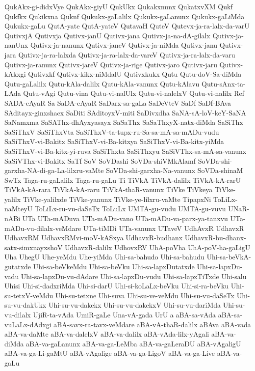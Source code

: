 {QukAkx-gi-didxVye
QukAkx-giyU
QukUkx
Qukakxnunx
QukatxvXM
Qukf
Qukfkx
Qukikxna
Quknf
Qukukx-gaLalilx
Qukukx-gaLanunx
Qukukx-gaLiMda
Qukukx-gaLu
QutA-yate
QutA-yateV
QutavaH
QuteV
Qutevx-ja-ra-lalx-da-varU
QutivxjA
Qutivxja
Qutivx-janU
Qutivx-jana
Qutivx-ja-na-dA-gilalx
Qutivx-ja-nanUnx
Qutivx-ja-nanunx
Qutivx-janeV
Qutivx-ja-niMda
Qutivx-janu
Qutivx-jara
Qutivx-ja-ra-lalxda
Qutivx-ja-ra-lalx-da-vareV
Qutivx-ja-ra-lalx-da-varu
Qutivx-ja-ranunx
Qutivx-jareV
Qutivx-ja-rige
Qutivx-jaro
Qutivx-jaru
Qutivx-kAkxgi
Qutivxkf
Qutivx-kikx-niMdalU
Qutivxkukx
Qutu
Qutu-doV-Sa-diMda
Qutu-gaLalilx
Qutu-kAla-dalilx
Qutu-kAla-vanunx
Qutu-kAlavu
Qutu-sAnx-ta-LAda
Qutu-vAgi
Qutu-vina
Qutu-vi-nalUlx
Qutu-vi-nalelxV
Qutu-vi-nalilx
Ref
SADA-cAyaR
Sa
SaDA-cAyaR
SaDarx-sa-gaLa
SaDeVteV
SaDf
SaDf-BAva
SAditayx-ginxshacx
SaDiti
SAditoyxV-miti
SaDivxdha
SaNA-sA-loV-keY-SaNA
SaNamxma
SaSAThx-dhAyxyasayx
SaSaThx
SaSaThxyX-natx-diMda
SaSiThx
SaSiThxV
SaSiThxVta
SaSiThxV-ta-tupx-ru-Sa-sa-mA-sa-mADu-vudu
SaSiThxV-vi-Bakitx
SaSiThxV-vi-Ba-kitxya
SaSiThxV-vi-Ba-kitx-yiMda
SaSiThxV-vi-Ba-kitx-yi-ruva
SaSiThxta
SaSiThxyu
SaSiVThx-sa-mA-sa-vanunx
SaSiVThx-vi-Bakitx
SaTf
SoV
SoVDashi
SoVDa-shiVMkAlamf
SoVDa-shi-garxha-NA-di-ga-La-lilxru-vaMte
SoVDa-shi-garxha-Na-vanunx
SoVDa-shinaM
SwTx
Taga-ru-gaLalilx
Taga-ru-gaLu
Ti
TiVkA
TiVkA-dalilx
TiVkA-kA-rarU
TiVkA-kA-rara
TiVkA-kA-raru
TiVkA-thaR-vanunx
TiVke
TiVkeya
TiVke-yalilx
TiVke-yalilxde
TiVke-yanunx
TiVke-ye-lilxru-vaMte
TipapxNi
ToLiLx-naMteyU
ToLiLx-ru-vu-daSeTx
ToLuLx
UMTA-gu-vudu
UMTA-gu-vuvu
UNaR-nABi
UTa
UTa-mADuva
UTa-mADu-vano
UTa-mADu-va-parx-ya-tanxvu
UTa-mADu-vu-dilalx-veMdare
UTa-tiMDi
UTa-vanunx
UTaveV
UdhAvxR
UdhavxR
UdhavxRM
UdhavxRMvi-moV-kASxya
UdhavxR-budhanx
UdhavxR-bu-dhanx-satx-simxnayxshoV
UdhavxR-dalilx
UdhovxRV
UhA-poVha
UhA-poV-ha-gaLigU
Uha
UhegU
Uhe-yeMdu
Uhe-yiMda
Uhi-sa-bahudo
Uhi-sa-bahudu
Uhi-sa-beVkA-gutatxde
Uhi-sa-beVkeMdu
Uhi-sa-beVku
Uhi-sa-lapxDutatxde
Uhi-sa-lapxDu-vadu
Uhi-sa-lapxDu-vu-dAdare
Uhi-sa-lapxDu-vudu
Uhi-sa-lapxTiTxde
Uhi-salu
Uhisi
Uhi-si-dadxriMda
Uhi-si-darU
Uhi-si-koLaLx-beVku
Uhi-si-ra-beVku
Uhi-su-tetxV-veMdu
Uhi-su-tetxne
Uhi-suva
Uhi-su-ve-veMdu
Uhi-su-vu-daSeTx
Uhi-su-vu-dakUkx
Uhi-su-vu-dakekx
Uhi-su-vu-dakekxV
Uhi-su-vu-dariMda
Uhi-su-vu-dilalx
UjiR-ta-vAda
UmiR-gaLe
Una-vA-gada
UrU
a
aBA-sa-vAda
aBA-sa-vuLaLx-dAdxgi
aBA-savx-ra-tavx-veMdare
aBA-vA-thaR-dalilx
aBAva
aBA-vada
aBA-va-daMte
aBA-va-dalelxV
aBA-va-dalilx
aBA-vAda-lilx-yAgali
aBA-va-diMda
aBA-va-gaLanunx
aBA-va-ga-LeMba
aBA-va-gaLeraDU
aBA-vAgaligU
aBA-va-ga-Li-gaMtU
aBA-vAgalige
aBA-va-ga-LigoV
aBA-va-ga-Live
aBA-va-gaLu
}

